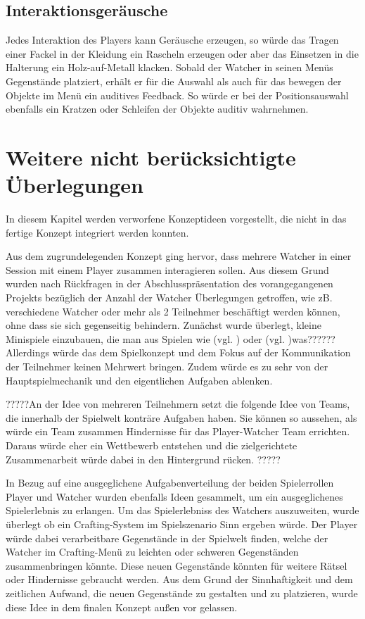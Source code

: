 \subsection{Interaktionsgeräusche}
Jedes Interaktion des Players kann Geräusche erzeugen, so würde das Tragen einer Fackel in der Kleidung ein Rascheln erzeugen oder aber das Einsetzen in die Halterung ein Holz-auf-Metall klacken. Sobald der Watcher in seinen Menüs Gegenstände platziert, erhält er für die Auswahl als auch für das bewegen der Objekte im Menü ein auditives Feedback. So würde er bei der Positionsauswahl ebenfalls ein Kratzen oder Schleifen der Objekte auditiv wahrnehmen.


\section{Weitere nicht berücksichtigte Überlegungen}
In diesem Kapitel werden verworfene Konzeptideen vorgestellt, die nicht in das fertige Konzept integriert werden konnten.

Aus dem zugrundelegenden Konzept ging hervor, dass mehrere Watcher in einer Session mit einem Player zusammen interagieren sollen. Aus diesem Grund wurden nach Rückfragen in der Abschlusspräsentation des vorangegangenen Projekts bezüglich der Anzahl der Watcher Überlegungen getroffen, wie  zB. verschiedene Watcher oder mehr als 2 Teilnehmer beschäftigt werden können, ohne dass sie sich gegenseitig behindern. Zunächst wurde überlegt, kleine Minispiele einzubauen, die man aus Spielen wie  (vgl. \cite{everbyte_duskwood_nodate}) oder  (vgl. \cite{jaunt_sentence_nodate})was?????? Allerdings würde das  dem Spielkonzept und dem Fokus auf der Kommunikation der Teilnehmer keinen Mehrwert bringen. Zudem würde es zu sehr von der Hauptspielmechanik und den eigentlichen Aufgaben ablenken.

?????An der Idee von mehreren Teilnehmern setzt die folgende Idee von Teams, die innerhalb der Spielwelt konträre Aufgaben haben. Sie können so aussehen, als würde ein Team zusammen Hindernisse für das Player-Watcher Team errichten. Daraus würde
eher ein Wettbewerb entstehen und die zielgerichtete Zusammenarbeit würde dabei
in den Hintergrund rücken. ?????

In Bezug auf eine ausgeglichene Aufgabenverteilung der beiden Spielerrollen Player und Watcher wurden ebenfalls Ideen gesammelt, um ein ausgeglichenes Spielerlebnis zu erlangen. Um das Spielerlebniss des Watchers auszuweiten, wurde überlegt ob ein Crafting-System im Spielszenario Sinn ergeben würde. Der Player würde dabei verarbeitbare Gegenstände in der Spielwelt finden, welche der Watcher im Crafting-Menü zu leichten oder schweren Gegenständen zusammenbringen könnte. Diese neuen Gegenstände könnten für weitere Rätsel oder Hindernisse gebraucht werden. Aus dem Grund der Sinnhaftigkeit und dem zeitlichen Aufwand, die neuen Gegenstände zu gestalten und zu platzieren, wurde diese Idee in dem finalen Konzept außen vor gelassen. 

